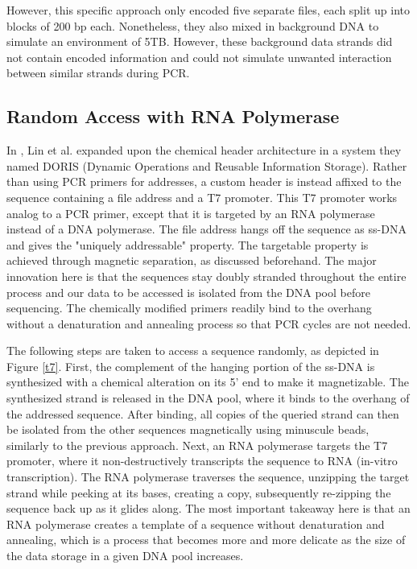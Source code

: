 \documentclass[a4paper,conference]{IEEEtran}
\begin{document}
However, this specific approach only encoded five separate files, each split up into blocks of 200 bp each. Nonetheless, they also mixed in background DNA to simulate an environment of 5TB. However, these background data strands did not contain encoded information and could not simulate unwanted interaction between similar strands during PCR.

\subsection{Random Access with RNA Polymerase}
In \cite{lin_dynamic_2020}, Lin et al. expanded upon the chemical header architecture in a system they named DORIS (Dynamic Operations and Reusable Information Storage). Rather than using PCR primers for addresses, a custom header is instead affixed to the sequence containing a file address and a T7 promoter. This T7 promoter works analog to a PCR primer, except that it is targeted by an RNA polymerase instead of a DNA polymerase. The file address hangs off the sequence as ss-DNA and gives the "uniquely addressable" property. The targetable property is achieved through magnetic separation, as discussed beforehand. The major innovation here is that the sequences stay doubly stranded throughout the entire process and our data to be accessed is isolated from the DNA pool before sequencing. The chemically modified primers readily bind to the overhang without a denaturation and annealing process so that PCR cycles are not needed.

The following steps are taken to access a sequence randomly, as depicted in Figure \ref{t7}. First, the complement of the hanging portion of the ss-DNA is synthesized with a chemical alteration on its 5' end to make it magnetizable. The synthesized strand is released in the DNA pool, where it binds to the overhang of the addressed sequence. After binding, all copies of the queried strand can then be isolated from the other sequences magnetically using minuscule beads, similarly to the previous approach. Next, an RNA polymerase targets the T7 promoter, where it non-destructively transcripts the sequence to RNA (in-vitro transcription). The RNA polymerase traverses the sequence, unzipping the target strand while peeking at its bases, creating a copy, subsequently re-zipping the sequence back up as it glides along. The most important takeaway here is that an RNA polymerase creates a template of a sequence without denaturation and annealing, which is a process that becomes more and more delicate as the size of the data storage in a given DNA pool increases.
\end{document}
